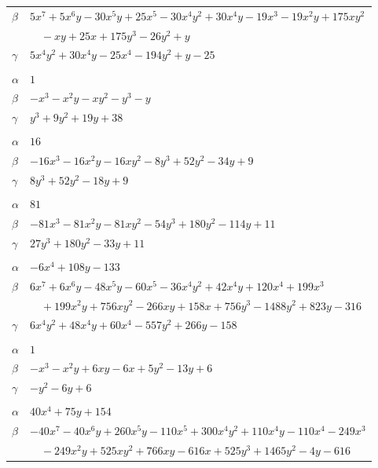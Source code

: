 \documentclass[11pt]{article}
\begin{document}
\begin{longtable}{@{}ll@{}}
$\beta$ & $5x^{7}+5x^{6}y-30x^{5}y+25x^{5}-30x^{4}y^{2}+30x^{4}y-19x^{3}-19x^{2}y+175xy^{2}$\\
 & $\quad -xy+25x+175y^{3}-26y^{2}+y$\\
$\gamma$ & $5x^{4}y^{2}+30x^{4}y-25x^{4}-194y^{2}+y-25$\\
\addlinespace[3pt]
\multicolumn{2}{@{}l}{$\{i,j\}=\{1,4\}$, $k_{ij}=7\cdot 11$}\\
$\alpha$ & $1$\\
$\beta$ & $-x^{3}-x^{2}y-xy^{2}-y^{3}-y$\\
$\gamma$ & $y^{3}+9y^{2}+19y+38$\\
\addlinespace[3pt]
\multicolumn{2}{@{}l}{$\{i,j\}=\{1,7\}$, $k_{ij}=7$}\\
$\alpha$ & $16$\\
$\beta$ & $-16x^{3}-16x^{2}y-16xy^{2}-8y^{3}+52y^{2}-34y+9$\\
$\gamma$ & $8y^{3}+52y^{2}-18y+9$\\
\addlinespace[3pt]
\multicolumn{2}{@{}l}{$\{i,j\}=\{1,15\}$, $k_{ij}=2\cdot 5\cdot 7$}\\
$\alpha$ & $81$\\
$\beta$ & $-81x^{3}-81x^{2}y-81xy^{2}-54y^{3}+180y^{2}-114y+11$\\
$\gamma$ & $27y^{3}+180y^{2}-33y+11$\\
\addlinespace[3pt]
\multicolumn{2}{@{}l}{$\{i,j\}=\{1,16\}$, $k_{ij}=5^{2}$}\\
$\alpha$ & $-6x^{4}+108y-133$\\
$\beta$ & $6x^{7}+6x^{6}y-48x^{5}y-60x^{5}-36x^{4}y^{2}+42x^{4}y+120x^{4}+199x^{3}$\\
 & $\quad +199x^{2}y+756xy^{2}-266xy+158x+756y^{3}-1488y^{2}+823y-316$\\
$\gamma$ & $6x^{4}y^{2}+48x^{4}y+60x^{4}-557y^{2}+266y-158$\\
\addlinespace[3pt]
\multicolumn{2}{@{}l}{$\{i,j\}=\{1,17\}$, $k_{ij}=7$}\\
$\alpha$ & $1$\\
$\beta$ & $-x^{3}-x^{2}y+6xy-6x+5y^{2}-13y+6$\\
$\gamma$ & $-y^{2}-6y+6$\\
\addlinespace[3pt]
\multicolumn{2}{@{}l}{$\{i,j\}=\{1,18\}$, $k_{ij}=2\cdot 3\cdot 7\cdot 11$}\\
$\alpha$ & $40x^{4}+75y+154$\\
$\beta$ & $-40x^{7}-40x^{6}y+260x^{5}y-110x^{5}+300x^{4}y^{2}+110x^{4}y-110x^{4}-249x^{3}$\\
 & $\quad -249x^{2}y+525xy^{2}+766xy-616x+525y^{3}+1465y^{2}-4y-616$\\

\end{longtable}
\end{document}
